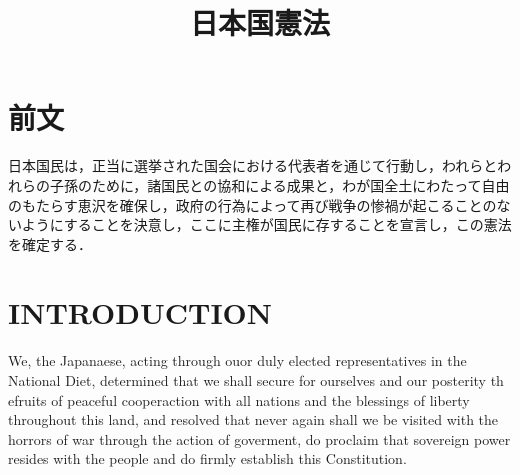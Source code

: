 \documentclass[twocolumn]{ltjsarticle}
\begin{document}
\title{日本国憲法}
\author{}
\date{}
\maketitle

\section*{前文}

日本国民は，正当に選挙された国会における代表者を通じて行動し，われらとわれらの子孫のために，諸国民との協和による成果と，わが国全土にわたって自由のもたらす恵沢を確保し，政府の行為によって再び戦争の惨禍が起こることのないようにすることを決意し，ここに主権が国民に存することを宣言し，この憲法を確定する．

\newpage

\section*{INTRODUCTION}

We, the Japanaese, acting through ouor duly elected representatives in the National Diet, determined that we shall secure for ourselves and our posterity th efruits of peaceful cooperaction with all nations and the blessings of liberty throughout this land, and resolved that never again shall we be visited with the horrors of war through the action of goverment, do proclaim that sovereign power resides with the people and do firmly establish this Constitution.
\end{document}
